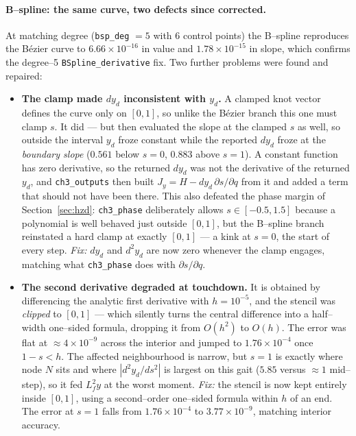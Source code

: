 \documentclass[11pt,a4paper]{article}
\newcommand{\code}[1]{\texttt{#1}}          %
\begin{document}
\paragraph{B--spline: the same curve, two defects since corrected.}
At matching degree (\code{bsp\_deg} $=5$ with $6$ control points) the B--spline
reproduces the B\'ezier curve to $6.66\times10^{-16}$ in value and
$1.78\times10^{-15}$ in slope, which confirms the degree--5
\code{BSpline\_derivative} fix. Two further problems were found and repaired:

\begin{itemize}
  \item \textbf{The clamp made $dy_d$ inconsistent with $y_d$.} A clamped knot
        vector defines the curve only on $[0,1]$, so unlike the B\'ezier branch
        this one must clamp $s$. It did --- but then evaluated the slope at the
        clamped $s$ as well, so outside the interval $y_d$ froze constant while
        the reported $dy_d$ froze at the \emph{boundary slope} ($0.561$ below
        $s=0$, $0.883$ above $s=1$). A constant function has zero derivative, so
        the returned $dy_d$ was not the derivative of the returned $y_d$, and
        \code{ch3\_outputs} then built $J_y = H - dy_d\,\partial s/\partial q$
        from it and added a term that should not have been there. This also
        defeated the phase margin of Section~\ref{sec:hzd}: \code{ch3\_phase}
        deliberately allows $s\in[-0.5,1.5]$ because a polynomial is well
        behaved just outside $[0,1]$, but the B--spline branch reinstated a hard
        clamp at exactly $[0,1]$ --- a kink at $s=0$, the start of every step.
        \emph{Fix:} $dy_d$ and $d^2y_d$ are now zero whenever the clamp engages,
        matching what \code{ch3\_phase} does with $\partial s/\partial q$.
  \item \textbf{The second derivative degraded at touchdown.} It is obtained by
        differencing the analytic first derivative with $h=10^{-5}$, and the
        stencil was \emph{clipped} to $[0,1]$ --- which silently turns the
        central difference into a half--width one--sided formula, dropping it
        from $O(h^2)$ to $O(h)$. The error was flat at $\approx4\times10^{-9}$
        across the interior and jumped to $1.76\times10^{-4}$ once $1-s<h$. The
        affected neighbourhood is narrow, but $s=1$ is exactly where node $N$
        sits and where $|d^2y_d/ds^2|$ is largest on this gait ($5.85$ versus
        $\approx1$ mid--step), so it fed $L_f^2y$ at the worst moment.
        \emph{Fix:} the stencil is now kept entirely inside $[0,1]$, using a
        second--order one--sided formula within $h$ of an end. The error at
        $s=1$ falls from $1.76\times10^{-4}$ to $3.77\times10^{-9}$, matching
        interior accuracy.
\end{itemize}
\end{document}
